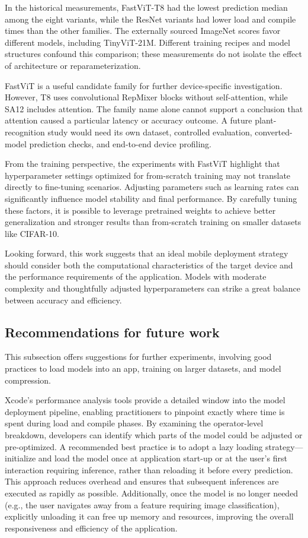 \documentclass[12pt]{article}
\begin{document}
In the historical measurements, FastViT-T8 had the lowest prediction median among the eight variants, while the ResNet variants had lower load and compile times than the other families. The externally sourced ImageNet scores favor different models, including TinyViT-21M. Different training recipes and model structures confound this comparison; these measurements do not isolate the effect of architecture or reparameterization.

FastViT is a useful candidate family for further device-specific investigation. However, T8 uses convolutional RepMixer blocks without self-attention, while SA12 includes attention. The family name alone cannot support a conclusion that attention caused a particular latency or accuracy outcome. A future plant-recognition study would need its own dataset, controlled evaluation, converted-model prediction checks, and end-to-end device profiling.

From the training perspective, the experiments with FastViT highlight that hyperparameter settings optimized for from-scratch training may not translate directly to fine-tuning scenarios. Adjusting parameters such as learning rates can significantly influence model stability and final performance. By carefully tuning these factors, it is possible to leverage pretrained weights to achieve better generalization and stronger results than from-scratch training on smaller datasets like CIFAR-10.

Looking forward, this work suggests that an ideal mobile deployment strategy should consider both the computational characteristics of the target device and the performance requirements of the application. Models with moderate complexity and thoughtfully adjusted hyperparameters can strike a great balance between accuracy and efficiency.

\subsection{Recommendations for future work}
This subsection offers suggestions for further experiments, involving good practices to load models into an app, training on larger datasets, and model compression.

Xcode’s performance analysis tools provide a detailed window into the model deployment pipeline, enabling practitioners to pinpoint exactly where time is spent during load and compile phases. By examining the operator-level breakdown, developers can identify which parts of the model could be adjusted or pre-optimized. A recommended best practice is to adopt a lazy loading strategy—initialize and load the model once at application start-up or at the user’s first interaction requiring inference, rather than reloading it before every prediction. This approach reduces overhead and ensures that subsequent inferences are executed as rapidly as possible. Additionally, once the model is no longer needed (e.g., the user navigates away from a feature requiring image classification), explicitly unloading it can free up memory and resources, improving the overall responsiveness and efficiency of the application.
\end{document}
